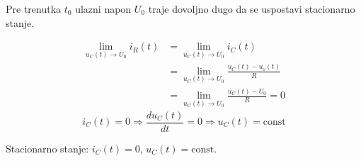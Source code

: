 \begin{frame}[label=08-s043]
\setlength{\parskip}{2pt}
\setlength{\abovedisplayskip}{4pt}\setlength{\belowdisplayskip}{4pt}
Pre trenutka $t_0$ ulazni napon $U_0$ traje dovoljno dugo da se uspostavi stacionarno stanje.\par\medskip
\begin{align*}
\lim_{u_C(t)\to U_0}i_R(t)&=\lim_{u_C(t)\to U_0}i_C(t)\\
&=\lim_{u_C(t)\to U_0}\frac{u_C(t)-u_o(t)}R\\
&=\lim_{u_C(t)\to U_0}\frac{u_C(t)-U_0}R=0
\end{align*}
\[i_C(t)=0\Rightarrow\frac{du_C(t)}{dt}=0\Rightarrow u_C(t)=\mathrm{const}\]
\medskip\par\centering Stacionarno stanje: $i_C(t)=0$, $u_C(t)=\mathrm{const}$.
\end{frame}
